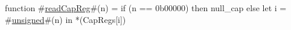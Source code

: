 function #\hyperref[zreadCapReg]{readCapReg}#(n) =
  if (n == 0b00000) then
    null_cap
  else
    let i = #\hyperref[zunsigned]{unsigned}#(n) in
    *(CapRegs[i])
